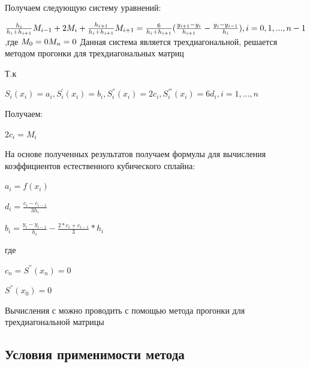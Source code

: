 Получаем следующую систему уравнений: 

 \begin{math}
 	\\
 		\frac{h_{i}}{h_{i}+h_{i+1}}M_{i-1}+2M_{i}+\frac{h_{i+1}}{h_{i}+h_{i+1}}M_{i+1}=\frac{6}{h_{i}+h_{i+1}}(\frac{y_{i+1}-y_{i}}{h_{i+1}}-\frac{y_{i}-y_{i-1}}{h_{i}}), i=0,1,...,n-1
 \end{math}
,где
 \begin{math} 
	\\
	M_{0}=0 \\
	M_{n}=0\\
\end{math}
Данная система является трехдиагональной, решается методом прогонки для трехдиагональных матриц
 
Т.к 

\begin{math} 
	S_{i}(x_{i})=a_{i}, S_{i}^{'}(x_{i})=b_{i},S_{i}^{''}(x_{i})=2c_{i}, S_{i}^{'''}(x_{i})=6d_{i}, i=1,...,n
\end{math}

Получаем: 

\begin{math} 
	2c_{i}=M_{i}
\end{math}

На основе полученных результатов получаем формулы для вычисления коэффициентов естественного кубического сплайна:

\begin{math} 
	a_{i}=f(x_{i})
\end{math}

\begin{math} 
	d_{i}=\frac{c_{i}-c_{i-1}}{3h_{i}}
\end{math}

\begin{math} 
	b_{i}=\frac{y_{i}-y_{i-1}}{h_{i}}-\frac{2*c_{i}+c_{i-1}}{3}*h_{i}
\end{math}

где 

\begin{math} 
	c_{n}=S^{''}(x_{n})=0
\end{math}

\begin{math} 
	S^{''}(x_{0})=0
\end{math}

Вычисления с можно проводить с помощью метода прогонки для трехдиагональной матрицы


\subsection{Условия применимости метода}

